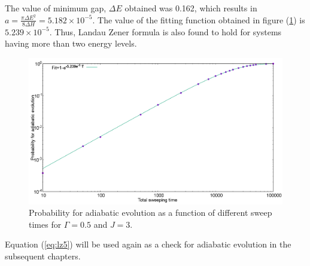 \documentclass[12]{article}
\begin{document}
The value of minimum gap, $\Delta E$ obtained was 0.162, which results in $a=\frac{\pi \Delta E^2}{8 \Delta H}= 5.182 \times 10^{-5}$. The value of the fitting function obtained in figure (\ref{fig:lz7}) is $5.239 \times 10^{-5}$. Thus, Landau Zener formula is also found to hold for systems having more than two energy levels.
\begin{figure}[H]
\centering 
\includegraphics[scale=0.3, width=6.5in]{Probability_H100.png}
\caption{Probability for adiabatic evolution as a function of different sweep times for $\Gamma=0.5$ and $J=3$.}
\label{fig:lz7}
\end{figure}
Equation (\ref{eq:lz5}) will be used again as a check for adiabatic evolution in the subsequent chapters.
\end{document}
